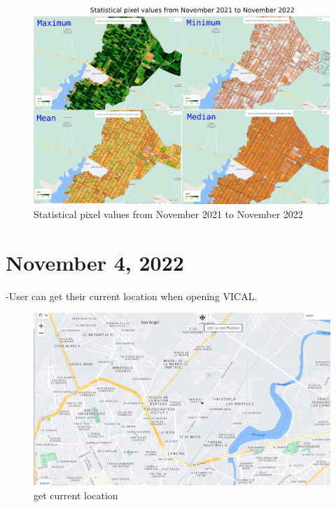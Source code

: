 \documentclass[
]{book}
\begin{document}
\begin{figure}

{\centering \includegraphics{./images/FigureA3} 

}

\caption{Statistical pixel values from November 2021 to November 2022}\label{fig:figA3}
\end{figure}

\hypertarget{november-4-2022}{%
\section{November 4, 2022}\label{november-4-2022}}

-User can get their current location when opening VICAL.

\begin{figure}

{\centering \includegraphics{./images/FigureA4} 

}

\caption{get current location}\label{fig:figA4}
\end{figure}
\end{document}
